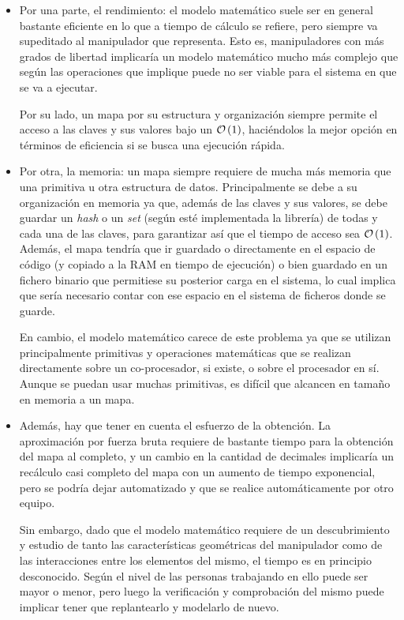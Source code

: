 \begin{itemize}
    \item Por una parte, el rendimiento: el modelo matemático suele ser en general
          bastante eficiente en lo que a tiempo de cálculo se refiere, pero siempre va
          supeditado al manipulador que representa. Esto es, manipuladores con más
          grados de libertad implicaría un modelo matemático mucho más complejo que según
          las operaciones que implique puede no ser viable para el sistema en que se va a ejecutar.

          Por su lado, un mapa por su estructura y organización siempre permite el acceso a las
          claves y sus valores bajo un $\bigO{1}$, haciéndolos la mejor opción en términos
          de eficiencia si se busca una ejecución rápida.

    \item Por otra, la memoria: un mapa siempre requiere de mucha más memoria que
          una primitiva u otra estructura de datos. Principalmente se debe a su organización
          en memoria ya que, además de las claves y sus valores, se debe guardar un \textit{hash}
          o un \textit{set} (según esté implementada la librería) de todas y cada una de las
          claves, para garantizar así que el tiempo de acceso sea $\bigO{1}$.
          Además, el mapa tendría que ir guardado o directamente en el espacio de código
          (y copiado a la \ac{RAM} en tiempo de ejecución) o bien guardado en un fichero
          binario que permitiese su posterior carga en el sistema, lo cual implica que sería
          necesario contar con ese espacio en el sistema de ficheros donde se guarde.

          En cambio, el modelo matemático carece de este problema ya que se utilizan
          principalmente primitivas y operaciones matemáticas que se realizan directamente
          sobre un co-procesador, si existe, o sobre el procesador en sí. Aunque se puedan
          usar muchas primitivas, es difícil que alcancen en tamaño en memoria a un mapa.

    \item Además, hay que tener en cuenta el esfuerzo de la obtención. La aproximación
          por fuerza bruta requiere de bastante tiempo para la obtención del mapa al completo,
          y un cambio en la cantidad de decimales implicaría un recálculo casi completo del mapa
          con un aumento de tiempo exponencial, pero se podría dejar automatizado y que se realice
          automáticamente por otro equipo.

          Sin embargo, dado que el modelo matemático requiere de un descubrimiento y estudio
          de tanto las características geométricas del manipulador como de las interacciones
          entre los elementos del mismo, el tiempo es en principio desconocido. Según el nivel
          de las personas trabajando en ello puede ser mayor o menor, pero luego la verificación
          y comprobación del mismo puede implicar tener que replantearlo y modelarlo de nuevo.
\end{itemize}

